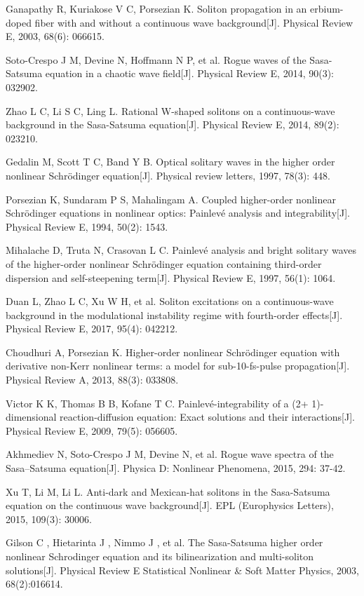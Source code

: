 \begin{thebibliography}{0}
Ganapathy R, Kuriakose V C, Porsezian K. Soliton propagation in an erbium-doped fiber with and without a continuous wave background[J]. Physical Review E, 2003, 68(6): 066615.

Soto-Crespo J M, Devine N, Hoffmann N P, et al. Rogue waves of the Sasa-Satsuma equation in a chaotic wave field[J]. Physical Review E, 2014, 90(3): 032902.

Zhao L C, Li S C, Ling L. Rational W-shaped solitons on a continuous-wave background in the Sasa-Satsuma equation[J]. Physical Review E, 2014, 89(2): 023210.

Gedalin M, Scott T C, Band Y B. Optical solitary waves in the higher order nonlinear Schrödinger equation[J]. Physical review letters, 1997, 78(3): 448.

Porsezian K, Sundaram P S, Mahalingam A. Coupled higher-order nonlinear Schrödinger equations in nonlinear optics: Painlevé analysis and integrability[J]. Physical Review E, 1994, 50(2): 1543.

Mihalache D, Truta N, Crasovan L C. Painlevé analysis and bright solitary waves of the higher-order nonlinear Schrödinger equation containing third-order dispersion and self-steepening term[J]. Physical Review E, 1997, 56(1): 1064.

Duan L, Zhao L C, Xu W H, et al. Soliton excitations on a continuous-wave background in the modulational instability regime with fourth-order effects[J]. Physical Review E, 2017, 95(4): 042212.

Choudhuri A, Porsezian K. Higher-order nonlinear Schrödinger equation with derivative non-Kerr nonlinear terms: a model for sub-10-fs-pulse propagation[J]. Physical Review A, 2013, 88(3): 033808.

Victor K K, Thomas B B, Kofane T C. Painlevé-integrability of a (2+ 1)-dimensional reaction-diffusion equation: Exact solutions and their interactions[J]. Physical Review E, 2009, 79(5): 056605.


Akhmediev N, Soto-Crespo J M, Devine N, et al. Rogue wave spectra of the Sasa–Satsuma equation[J]. Physica D: Nonlinear Phenomena, 2015, 294: 37-42.

Xu T, Li M, Li L. Anti-dark and Mexican-hat solitons in the Sasa-Satsuma equation on the continuous wave background[J]. EPL (Europhysics Letters), 2015, 109(3): 30006.


Gilson C , Hietarinta J , Nimmo J , et al. The Sasa-Satsuma higher order nonlinear Schrodinger equation and its bilinearization and multi-soliton solutions[J]. Physical Review E Statistical Nonlinear \& Soft Matter Physics, 2003, 68(2):016614.


\end{thebibliography}
